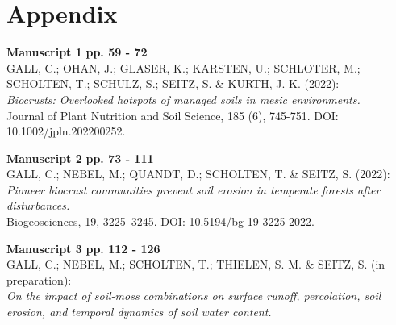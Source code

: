 \chapter*{Appendix}
\label{chap:appendix_overview} %


\noindent %
\textbf{Manuscript 1} \hfill \textbf{pp. 59 - 72} \\ %
GALL, C.; OHAN, J.; GLASER, K.; KARSTEN, U.; SCHLOTER, M.; SCHOLTEN, T.; SCHULZ, S.; SEITZ, S. \& KURTH, J. K. (2022): \\
\textit{Biocrusts: Overlooked hotspots of managed soils in mesic environments.} \\
Journal of Plant Nutrition and Soil Science, 185 (6), 745-751. DOI: 10.1002/jpln.202200252.

\vspace{\baselineskip} %

\noindent
\textbf{Manuscript 2} \hfill \textbf{pp. 73 - 111} \\ %
GALL, C.; NEBEL, M.; QUANDT, D.; SCHOLTEN, T. \& SEITZ, S. (2022): \\
\textit{Pioneer biocrust communities prevent soil erosion in temperate forests after disturbances.} \\
Biogeosciences, 19, 3225–3245. DOI: 10.5194/bg-19-3225-2022.

\vspace{\baselineskip}

\noindent
\textbf{Manuscript 3} \hfill \textbf{pp. 112 - 126} \\ %
GALL, C.; NEBEL, M.; SCHOLTEN, T.; THIELEN, S. M. \& SEITZ, S. (in preparation): \\
\textit{On the impact of soil-moss combinations on surface runoff, percolation, soil erosion, and temporal dynamics of soil water content.}

\vspace{\baselineskip}

